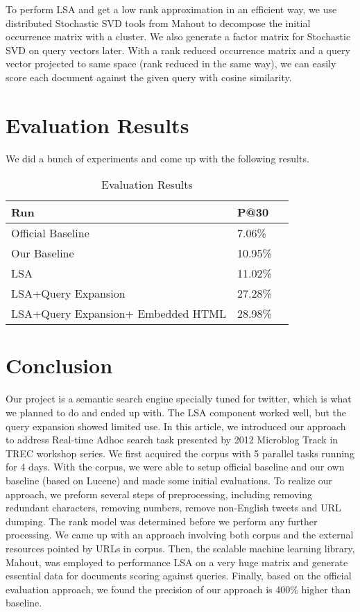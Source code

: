 \documentclass{acm_proc_article-sp}
\begin{document}
To perform LSA and get a low rank approximation in an efficient way, we use distributed Stochastic SVD\cite{halko2012randomized} tools from Mahout to decompose the initial occurrence matrix with a cluster. We also generate a factor matrix for Stochastic SVD on query vectors later. With a rank reduced occurrence matrix and a query vector projected to same space (rank reduced in the same way), we can easily score each document against the given query with cosine similarity\cite{singhal2001modern}.


\section{Evaluation Results}
We did a bunch of experiments and come up with the following results.
\begin{table}
\centering
\caption{Evaluation Results}
\begin{tabular}{|l|l|l} \hline
Run&P@30\\ \hline
Official Baseline&7.06\%\\ \hline
Our Baseline&10.95\%\\ \hline
LSA&11.02\%\\ \hline
LSA+Query Expansion&27.28\%\\ \hline
LSA+Query Expansion+ Embedded HTML&28.98\%\\ \hline
\hline\end{tabular}
\end{table}


\section{Conclusion}
Our project is a semantic search engine specially tuned for twitter, which is what we planned to do and ended up with. The LSA component worked well, but the query expansion showed limited use. In this article, we introduced our approach to address Real-time Adhoc search task presented by 2012 Microblog Track in TREC workshop series. We first acquired the corpus with 5 parallel tasks running for 4 days. With the corpus, we were able to setup official baseline and our own baseline (based on Lucene) and made some initial evaluations. To realize our approach, we preform several steps of preprocessing, including removing redundant characters, removing numbers, remove non-English tweets and URL dumping. The rank model was determined before we perform any further processing. We came up with an approach involving both corpus and the external resources pointed by URLs in corpus. Then, the scalable machine learning library, Mahout, was employed to performance LSA on a very huge matrix and generate essential data for documents scoring against queries. Finally, based on the official evaluation approach, we found the precision of our approach is 400\% higher than baseline.
\end{document}
